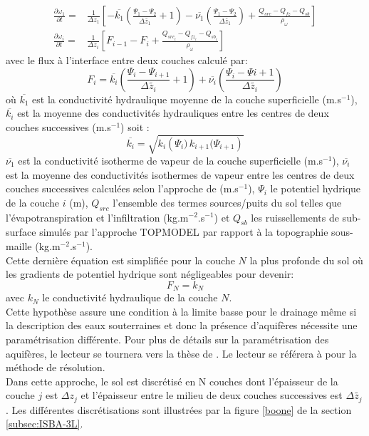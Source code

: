\begin{align}
\frac{\partial \omega_{1}}{\partial t} =& \frac{1}{\Delta z_{1}}[-\overline{k_{1}}(\frac{\Psi_{1}-\Psi_{2}}{\Delta \widetilde{z_{1}}}+1)- \overline{\nu_{1}} (\frac{\Psi_{1}-\Psi_{2}}{\Delta \widetilde{z_{1}}})+\frac{Q_{src}-Q_{fz}-Q_{sb}}{\rho_{\omega}}]
\\
\frac{\partial \omega_{i}}{\partial t} =& \frac{1}{\Delta z_{i}} [F_{i-1}-F_{i}+\frac{Q_{src_{i}}-Q_{fz_{i}}-Q_{sb_{i}}}{\rho_{\omega}}]
\end{align}
%
avec le flux à l'interface entre deux couches calculé par:
\begin{equation}
F_{i}=\overline{k_{i}}\left(\frac{\Psi_{i}-\Psi_{i+1}}{\Delta \widetilde{z_{i}}}+1\right) + \overline{\nu_{i}}\left(\frac{\Psi_{i}-\Psi{i+1}}{\Delta \widetilde{z_{i}}}\right)
\end{equation}
où $\overline{k_{1}}$ est la conductivité hydraulique moyenne de la couche superficielle (m.s$^{-1}$), $\overline{k_{i}}$ est la moyenne des conductivités hydrauliques entre les centres de deux couches successives (m.s$^{-1}$) soit :
%
\begin{equation}
\overline{k_{i}}= \sqrt{ k_{i}\left(\Psi_{i})  \, k_{i+1}(\Psi_{i+1}\right)}
\end{equation}
%
$\overline{\nu_{1}}$ est la conductivité isotherme de vapeur de la couche superficielle (m.s$^{-1}$), $\overline{\nu_{i}}$ est la moyenne des conductivités isothermes de vapeur entre les centres de deux couches successives calculées selon l'approche de \citet{braud1993} (m.s$^{-1}$), $\Psi_{i}$ le potentiel hydrique de la couche $i$ (m), $Q_{src}$ l'ensemble des termes sources/puits du sol telles que l'évapotranspiration et l'infiltration (kg.m$^{-2}$.s$^{-1}$) et $Q_{sb}$ les ruissellements de sub-surface simulés par l'approche TOPMODEL par rapport à la topographie sous-maille (kg.m$^{-2}$.s$^{-1}$).\\

\noindent Cette dernière équation est simplifiée pour la couche $N$ la plus profonde du sol où les gradients de potentiel hydrique sont négligeables pour devenir:
%
\begin{equation}
F_{N} = k_{N}
\end{equation}
%
avec $k_{N}$ le conductivité hydraulique de la couche $N$.\\

\noindent Cette hypothèse assure une condition à la limite basse pour le drainage même si la description des eaux souterraines et donc la présence d'aquifères nécessite une paramétrisation différente. Pour plus de détails sur la paramétrisation des aquifères, le lecteur se tournera vers la thèse de \citet{vergnes2012these}. Le lecteur se référera à \citet{boone2000} pour la méthode de résolution.\\
Dans cette approche, le sol est discrétisé en N couches dont l'épaisseur de la couche $j$ est $\Delta z_{j}$ et l'épaisseur entre le milieu de deux couches successives est $\Delta \widetilde{z_{j}}$. 
Les différentes discrétisations sont illustrées par la figure \ref{boone} de la section \ref{subsec:ISBA-3L}.\\

